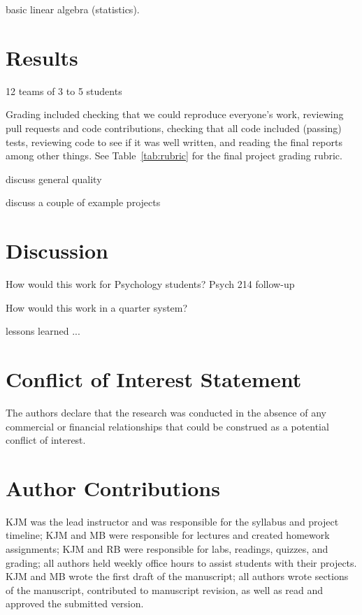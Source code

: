 basic linear algebra (statistics).



\section{Results}\label{results}

12 teams of 3 to 5 students

Grading included checking that we could reproduce everyone's work, reviewing pull
requests and code contributions, checking that all code included
(passing) tests, reviewing code to see if it was well written, and
reading the final reports among other things. 
See Table~\ref{tab:rubric} for the final project grading rubric.


discuss general quality

discuss a couple of example projects
\citep{tom2007neural}

\section{Discussion}\label{discussion}

How would this work for Psychology students?  Psych 214 follow-up

How would this work in a quarter system?

lessons learned ...


\section*{Conflict of Interest Statement}

The authors declare that the research was conducted in the absence of any commercial or financial relationships that could be construed as a potential conflict of interest.

\section*{Author Contributions}

KJM was the lead instructor and was responsible for the syllabus and project timeline;
KJM and MB were responsible for lectures and created homework assignments;
KJM and RB were responsible for labs, readings, quizzes, and grading;
all authors held weekly office hours to assist students with their projects.
KJM and MB wrote the first draft of the manuscript;
all authors wrote sections of the manuscript, contributed to manuscript revision, 
as well as read and approved the submitted version.

